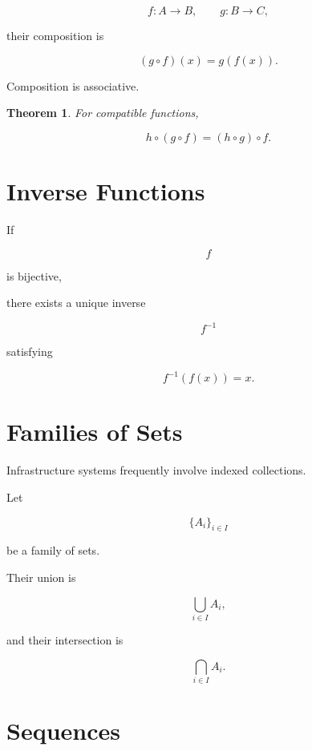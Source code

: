 \documentclass[11pt,fleqn]{book}
\numberwithin{equation}{chapter}
\theoremstyle{plain}
\newtheorem{theorem}{Theorem}[chapter]
\theoremstyle{definition}
\theoremstyle{remark}
\begin{document}
\[
f:A\rightarrow B,
\qquad
g:B\rightarrow C,
\]

their composition is

\[
(g\circ f)(x)
=
g(f(x)).
\]

Composition is associative.


\begin{theorem}

For compatible functions,

\[
h\circ(g\circ f)
=
(h\circ g)\circ f.
\]

\end{theorem}


\section{Inverse Functions}

If

\[
f
\]

is bijective,

there exists a unique inverse

\[
f^{-1}
\]

satisfying

\[
f^{-1}(f(x))
=
x.
\]


\section{Families of Sets}

Infrastructure systems frequently involve indexed collections.

Let

\[
\{A_i\}_{i\in I}
\]

be a family of sets.

Their union is

\[
\bigcup_{i\in I}A_i,
\]

and their intersection is

\[
\bigcap_{i\in I}A_i.
\]


\section{Sequences}
\end{document}
